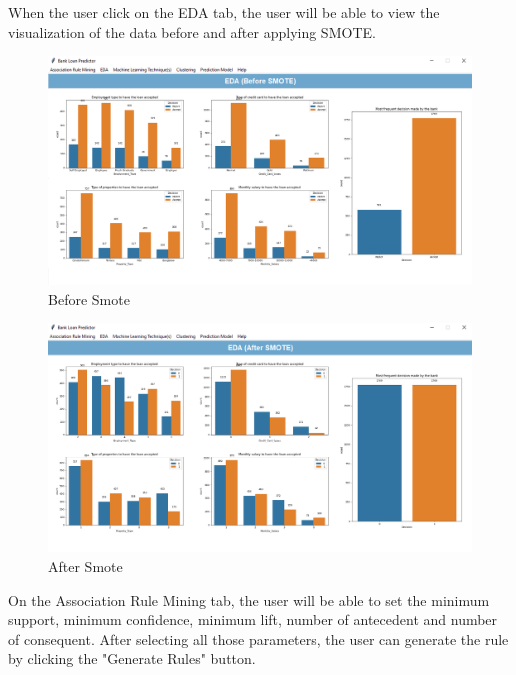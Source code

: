 \documentclass[11pt]{article}
\begin{document}
When the user click on the EDA tab, the user will be able to view the visualization of the data before and after applying SMOTE.

\begin{figure}[h]
\centerline{\includegraphics[scale=0.35]{deploy_b4Smote.PNG}}
\label{fig:deployBsmote}
\caption{Before Smote}
\end{figure}

\begin{figure}[h]
\centerline{\includegraphics[scale=0.35]{deploy_smote.PNG}}
\label{fig:deployARM}
\caption{After Smote}
\end{figure}

\clearpage

On the Association Rule Mining tab, the user will be able to set the minimum support, minimum confidence, minimum lift, number of antecedent and number of consequent. After selecting all those parameters, the user can generate the rule by clicking the "Generate Rules" button.
\end{document}
